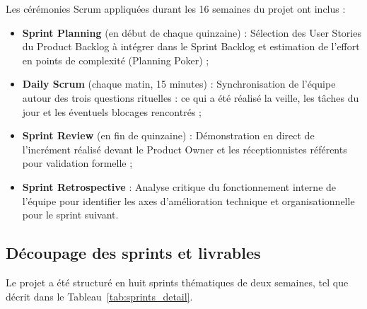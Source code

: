 Les cérémonies Scrum appliquées durant les 16 semaines du projet ont inclus :
\begin{itemize}
    \item \textbf{Sprint Planning} (en début de chaque quinzaine) : Sélection des User Stories du Product Backlog à intégrer dans le Sprint Backlog et estimation de l'effort en points de complexité (Planning Poker) ;
    \item \textbf{Daily Scrum} (chaque matin, 15 minutes) : Synchronisation de l'équipe autour des trois questions rituelles : ce qui a été réalisé la veille, les tâches du jour et les éventuels blocages rencontrés ;
    \item \textbf{Sprint Review} (en fin de quinzaine) : Démonstration en direct de l'incrément réalisé devant le Product Owner et les réceptionnistes référents pour validation formelle ;
    \item \textbf{Sprint Retrospective} : Analyse critique du fonctionnement interne de l'équipe pour identifier les axes d'amélioration technique et organisationnelle pour le sprint suivant.
\end{itemize}

\subsection{Découpage des sprints et livrables}

Le projet a été structuré en huit sprints thématiques de deux semaines, tel que décrit dans le Tableau~\ref{tab:sprints_detail}.

